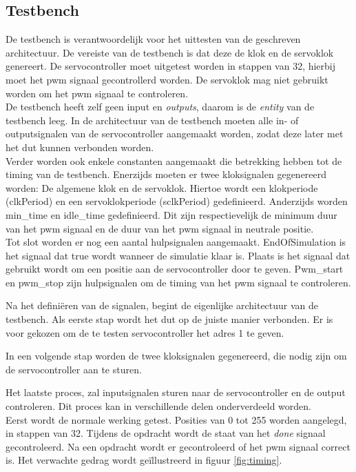 \subsection{Testbench}

De testbench is verantwoordelijk voor het uittesten van de geschreven architectuur. De vereiste van de testbench is dat deze de klok en de servoklok genereert. De servocontroller moet uitgetest worden in stappen van 32, hierbij moet het \gls{pwm} signaal gecontrollerd worden. De servoklok mag niet gebruikt worden om het \gls{pwm} signaal te controleren.\\

\noindent
De testbench heeft zelf geen input en \textit{outputs}, daarom is de \textit{entity} van de testbench leeg. In de architectuur van de testbench moeten alle in- of outputsignalen  van de servocontroller aangemaakt worden, zodat deze later met het \gls{dut} kunnen verbonden worden.\\

\noindent
Verder worden ook enkele constanten aangemaakt die betrekking hebben tot de timing van de testbench. Enerzijds moeten er twee kloksignalen gegenereerd worden: De algemene klok en de servoklok. Hiertoe wordt een klokperiode (clkPeriod) en een servoklokperiode (sclkPeriod) gedefinieerd. Anderzijds worden min\_time en idle\_time gedefinieerd. Dit zijn respectievelijk de minimum duur van het \gls{pwm} signaal en de duur van het \gls{pwm} signaal in neutrale positie.\\

\noindent
Tot slot worden er nog een aantal hulpsignalen aangemaakt. EndOfSimulation is het signaal dat true wordt wanneer de simulatie klaar is. Plaats is het signaal dat gebruikt wordt om een positie aan de servocontroller door te geven. Pwm\_start en pwm\_stop zijn hulpsignalen om de timing van het \gls{pwm} signaal te controleren. 


Na het defini\"{e}ren van de signalen, begint de eigenlijke architectuur van de testbench. Als eerste stap wordt het \gls{dut} op de juiste manier verbonden. Er is voor gekozen om de te testen servocontroller het adres 1 te geven.


In een volgende stap worden de twee kloksignalen gegenereerd, die nodig zijn om de servocontroller aan te sturen.

Het laatste proces, zal inputsignalen sturen naar de servocontroller en de output controleren. Dit proces kan in verschillende delen onderverdeeld worden.\\
\noindent
Eerst wordt de normale werking getest. Posities van 0 tot 255 worden aangelegd, in stappen van 32. Tijdens de opdracht wordt de staat van het \textit{done} signaal gecontroleerd. Na een opdracht wordt er gecontroleerd of het \gls{pwm} signaal correct is. Het verwachte gedrag wordt ge\"{i}llustreerd in figuur \ref{fig:timing}.\\

